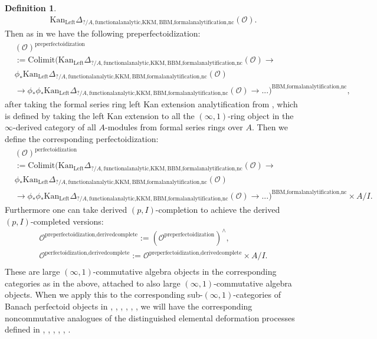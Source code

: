 \documentclass[11pt]{book}
\theoremstyle{definition}
\newtheorem{definition}[theorem]{Definition}
\numberwithin{equation}{section}
\begin{document}
\begin{definition}
\begin{align}
\mathrm{Kan}_{\mathrm{Left}}\Delta_{?/A,\text{functionalanalytic,KKM},\text{BBM,formalanalytification,nc}}(\mathcal{O}).
\end{align}	
Then as in \cite[Definition 8.2]{12BS} we have the following preperfectoidization:
\begin{align}
&(\mathcal{O})^{\text{preperfectoidization}}\\
&:=\mathrm{Colimit}(\mathrm{Kan}_{\mathrm{Left}}\Delta_{?/A,\text{functionalanalytic,KKM},\text{BBM,formalanalytification,nc}}(\mathcal{O})\rightarrow \\
&\phi_*\mathrm{Kan}_{\mathrm{Left}}\Delta_{?/A,\text{functionalanalytic,KKM},\text{BBM,formalanalytification,nc}}(\mathcal{O})\\
&\rightarrow \phi_* \phi_*\mathrm{Kan}_{\mathrm{Left}}\Delta_{?/A,\text{functionalanalytic,KKM},\text{BBM,formalanalytification,nc}}(\mathcal{O})\rightarrow...)^{\text{BBM,formalanalytification,nc}},	
\end{align}
after taking the formal series ring left Kan extension analytification from \cite[Section 4.2]{BBM}, which is defined by taking the left Kan extension to all the $(\infty,1)$-ring object in the $\infty$-derived category of all $A$-modules from formal series rings over $A$. Then we define the corresponding perfectoidization:
\begin{align}
&(\mathcal{O})^{\text{perfectoidization}}\\
&:=\mathrm{Colimit}(\mathrm{Kan}_{\mathrm{Left}}\Delta_{?/A,\text{functionalanalytic,KKM},\text{BBM,formalanalytification,nc}}(\mathcal{O})\longrightarrow \\
&\phi_*\mathrm{Kan}_{\mathrm{Left}}\Delta_{?/A,\text{functionalanalytic,KKM},\text{BBM,formalanalytification,nc}}(\mathcal{O})\\
&\longrightarrow \phi_* \phi_*\mathrm{Kan}_{\mathrm{Left}}\Delta_{?/A,\text{functionalanalytic,KKM},\text{BBM,formalanalytification,nc}}(\mathcal{O})\longrightarrow...)^{\text{BBM,formalanalytification,nc}}\times A/I.	
\end{align}
Furthermore one can take derived $(p,I)$-completion to achieve the derived $(p,I)$-completed versions:
\begin{align}
\mathcal{O}^\text{preperfectoidization,derivedcomplete}:=(\mathcal{O}^\text{preperfectoidization})^{\wedge},\\
\mathcal{O}^\text{perfectoidization,derivedcomplete}:=\mathcal{O}^\text{preperfectoidization,derivedcomplete}\times A/I.\\
\end{align}
These are large $(\infty,1)$-commutative algebra objects in the corresponding categories as in the above, attached to also large $(\infty,1)$-commutative algebra objects. When we apply this to the corresponding sub-$(\infty,1)$-categories of Banach perfectoid objects in \cite{BMS2}, \cite{GR}, \cite{12KL1}, \cite{12KL2}, \cite{12Ked1}, \cite{12Sch3},  we will have the corresponding noncommutative analogues of the distinguished elemental deformation processes defined in \cite{BMS2}, \cite{GR}, \cite{12KL1}, \cite{12KL2}, \cite{12Ked1}, \cite{12Sch3}. 
\end{definition}
\end{document}
